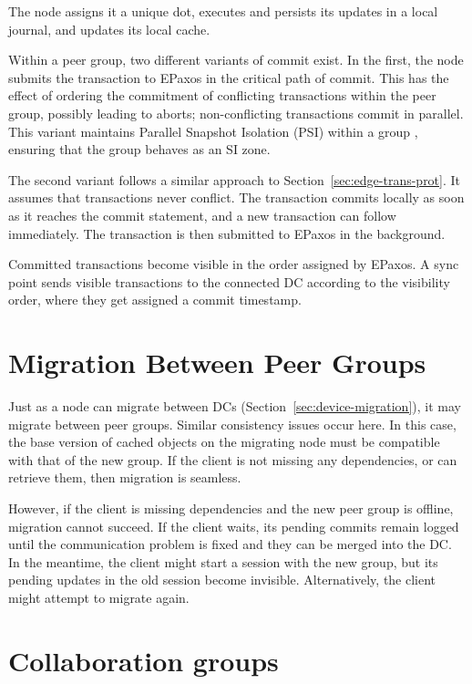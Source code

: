 The node assigns it a unique dot, executes and persists its updates in
a local journal, and updates its local cache.

Within a peer group, two different variants of commit exist.
In the first, the node submits the transaction to EPaxos in the critical
path of commit.
This has the effect of ordering the commitment of conflicting
transactions within the peer group, possibly leading to aborts;
non-conflicting transactions commit in parallel.
This variant maintains Parallel Snapshot Isolation (PSI) within a group
\cite{rep:syn:1661}, ensuring that the group behaves as an SI zone.

The second variant follows a similar approach to
Section~\ref{sec:edge-trans-prot}.
It assumes that transactions never conflict.
The transaction commits locally as soon as it reaches the commit
statement, and a new transaction can follow immediately.
The transaction is then submitted to EPaxos in the background.

Committed transactions become visible in the order
assigned by EPaxos.
A sync point sends visible transactions to the connected DC according
to the visibility order, where they get assigned a commit timestamp.

\section{Migration Between Peer Groups}
\label{sec:migration-to-peer-group}

Just as a node can migrate between DCs
(Section~\ref{sec:device-migration}), it may migrate between peer
groups.
Similar consistency issues occur here.
In this case, the base version of cached objects on the migrating node
must be compatible with that of the new group.
If the client is not missing any dependencies, or can retrieve them,
then migration is seamless.

However, if the client is missing dependencies and the new peer group is
offline, migration cannot succeed.
If the client waits, its pending commits remain logged until the
communication problem is fixed and they can be merged into the DC\@.
In the meantime, the client might start a session with the new group,
but its pending updates in the old session become invisible.
Alternatively, the client might attempt to  migrate again.

\section{Collaboration groups}
\label{sec:security-protocol}

